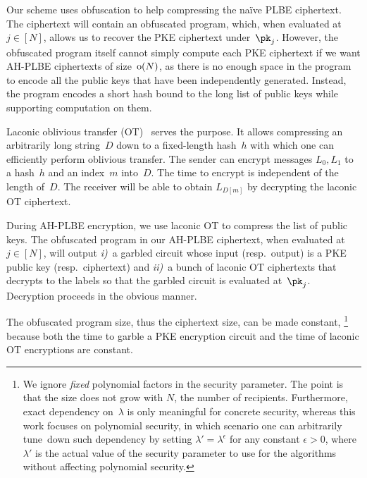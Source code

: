 Our scheme uses obfuscation to help compressing the na{\"i}ve PLBE ciphertext.
The ciphertext will contain an obfuscated program, which, when evaluated at~${j\in[N]}$, allows us to recover the PKE ciphertext under~$\pk_j$.
However, the obfuscated program itself cannot simply compute each PKE ciphertext if we want AH-PLBE ciphertexts of size~$\operatorname{o}(N)$, as there is no enough space in the program to encode all the public keys that have been independently generated.
Instead, the program encodes a short hash
bound to the long list of public keys
while supporting computation on them.

Laconic oblivious transfer (OT)~\cite{C:CDGGMP17} serves the purpose.
It allows compressing an arbitrarily long string~$D$ down to a fixed-length hash~$h$ with which one can efficiently perform oblivious transfer.
The sender can encrypt messages $L_0,L_1$ to a hash~$h$ and an index~$m$ into~$D$.
The time to encrypt is independent of the length of~$D$.
The receiver will be able to obtain $L_{D[m]}$ by decrypting the laconic OT ciphertext.

During AH-PLBE encryption, we use laconic OT to compress the list of public keys.
The obfuscated program in our AH-PLBE ciphertext, when evaluated at~${j\in[N]}$, will output
\emph{i)}~a garbled circuit whose input (resp.~output) is a PKE public key (resp.~ciphertext) and
\emph{ii)}~a bunch of laconic OT ciphertexts that decrypts to the labels so that the garbled circuit is evaluated at~$\pk_j$.
Decryption proceeds in the obvious manner.

The obfuscated program size, thus the ciphertext size, can be made constant,%
\footnote{\label{fn:ignore-poly-lambda}%
We ignore \emph{fixed} polynomial factors in the security parameter.
The point is that the size does not grow with $N$, the number of recipients.
Furthermore, exact dependency on~$\lambda$ is
only meaningful for concrete security,
whereas this work focuses on polynomial security,
in which scenario one can arbitrarily tune~down such dependency by setting
${\lambda'=\lambda^\epsilon}$ for any constant ${\epsilon>0}$,
where $\lambda'$ is the actual value of the security parameter
to use for the algorithms without affecting polynomial security.}
because
both the time to garble a PKE encryption circuit and the time of laconic OT encryptions are constant.
